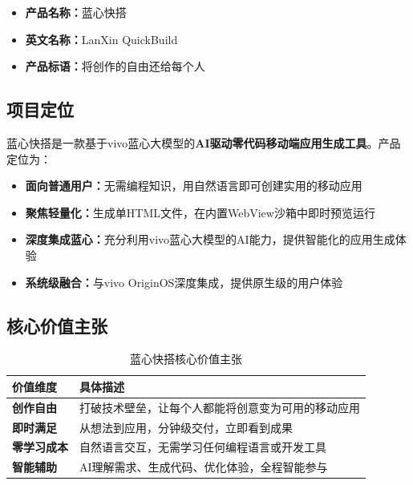 \documentclass[a4paper,12pt]{ctexart}
\newcommand{\highlight}[1]{\textcolor{vivoblue}{\textbf{#1}}}
\begin{document}
\begin{itemize}[leftmargin=2em]
    \item \textbf{产品名称：}蓝心快搭
    \item \textbf{英文名称：}LanXin QuickBuild
    \item \textbf{产品标语：}将创作的自由还给每个人
\end{itemize}

\subsection{项目定位}

蓝心快搭是一款基于vivo蓝心大模型的\highlight{AI驱动零代码移动端应用生成工具}。产品定位为：

\begin{itemize}[leftmargin=2em]
    \item \textbf{面向普通用户：}无需编程知识，用自然语言即可创建实用的移动应用
    \item \textbf{聚焦轻量化：}生成单HTML文件，在内置WebView沙箱中即时预览运行
    \item \textbf{深度集成蓝心：}充分利用vivo蓝心大模型的AI能力，提供智能化的应用生成体验
    \item \textbf{系统级融合：}与vivo OriginOS深度集成，提供原生级的用户体验
\end{itemize}

\subsection{核心价值主张}

\begin{table}[H]
    \centering
    \caption{蓝心快搭核心价值主张}
    \begin{tabularx}{\textwidth}{|l|X|}
        \hline
        \textbf{价值维度} & \textbf{具体描述} \\
        \hline
        \highlight{创作自由} & 打破技术壁垒，让每个人都能将创意变为可用的移动应用 \\
        \hline
        \highlight{即时满足} & 从想法到应用，分钟级交付，立即看到成果 \\
        \hline
        \highlight{零学习成本} & 自然语言交互，无需学习任何编程语言或开发工具 \\
        \hline
        \highlight{智能辅助} & AI理解需求、生成代码、优化体验，全程智能参与 \\
        \hline
    \end{tabularx}
\end{table}
\end{document}

